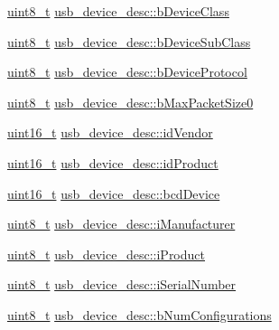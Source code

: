 \begin{DoxyCompactItemize}
\item 
\hyperlink{stdint_8h_aba7bc1797add20fe3efdf37ced1182c5}{uint8\-\_\-t} \hyperlink{group___p_i_o_s___u_s_b___d_e_f_s_ga04601bd230a37ec17da04c14036b4094}{usb\-\_\-device\-\_\-desc\-::b\-Device\-Class}
\item 
\hyperlink{stdint_8h_aba7bc1797add20fe3efdf37ced1182c5}{uint8\-\_\-t} \hyperlink{group___p_i_o_s___u_s_b___d_e_f_s_ga020d77d32b45dfd9fe9991cd975dddd7}{usb\-\_\-device\-\_\-desc\-::b\-Device\-Sub\-Class}
\item 
\hyperlink{stdint_8h_aba7bc1797add20fe3efdf37ced1182c5}{uint8\-\_\-t} \hyperlink{group___p_i_o_s___u_s_b___d_e_f_s_ga3d64799ad816edeb66ecba053618b8aa}{usb\-\_\-device\-\_\-desc\-::b\-Device\-Protocol}
\item 
\hyperlink{stdint_8h_aba7bc1797add20fe3efdf37ced1182c5}{uint8\-\_\-t} \hyperlink{group___p_i_o_s___u_s_b___d_e_f_s_gaf24518f19202bda273da937e32dff924}{usb\-\_\-device\-\_\-desc\-::b\-Max\-Packet\-Size0}
\item 
\hyperlink{stdint_8h_a273cf69d639a59973b6019625df33e30}{uint16\-\_\-t} \hyperlink{group___p_i_o_s___u_s_b___d_e_f_s_ga4bafd49b2f07a14cb215c8cfe917ad5a}{usb\-\_\-device\-\_\-desc\-::id\-Vendor}
\item 
\hyperlink{stdint_8h_a273cf69d639a59973b6019625df33e30}{uint16\-\_\-t} \hyperlink{group___p_i_o_s___u_s_b___d_e_f_s_gad96a4bfe2eaf1a6556d633bb896a8683}{usb\-\_\-device\-\_\-desc\-::id\-Product}
\item 
\hyperlink{stdint_8h_a273cf69d639a59973b6019625df33e30}{uint16\-\_\-t} \hyperlink{group___p_i_o_s___u_s_b___d_e_f_s_ga4c68faa7a3ea8607c0d9aeb9cc755169}{usb\-\_\-device\-\_\-desc\-::bcd\-Device}
\item 
\hyperlink{stdint_8h_aba7bc1797add20fe3efdf37ced1182c5}{uint8\-\_\-t} \hyperlink{group___p_i_o_s___u_s_b___d_e_f_s_gabaeafe49bb2dac8e1a9d55a693300c6d}{usb\-\_\-device\-\_\-desc\-::i\-Manufacturer}
\item 
\hyperlink{stdint_8h_aba7bc1797add20fe3efdf37ced1182c5}{uint8\-\_\-t} \hyperlink{group___p_i_o_s___u_s_b___d_e_f_s_ga1aa83bdef33f6f67cef07ee0e0cbe7b1}{usb\-\_\-device\-\_\-desc\-::i\-Product}
\item 
\hyperlink{stdint_8h_aba7bc1797add20fe3efdf37ced1182c5}{uint8\-\_\-t} \hyperlink{group___p_i_o_s___u_s_b___d_e_f_s_gae04d0f21a04c4db709e0a05dcb9ecd3a}{usb\-\_\-device\-\_\-desc\-::i\-Serial\-Number}
\item 
\hyperlink{stdint_8h_aba7bc1797add20fe3efdf37ced1182c5}{uint8\-\_\-t} \hyperlink{group___p_i_o_s___u_s_b___d_e_f_s_ga65e3f56a6dc737eb78053a7ad50d75f8}{usb\-\_\-device\-\_\-desc\-::b\-Num\-Configurations}

\end{DoxyCompactItemize}
